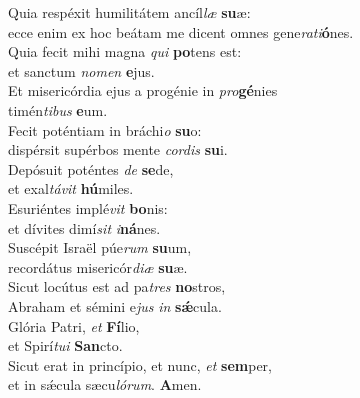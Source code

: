 \oddverse Quia respéxit humilitátem ancíl\textit{læ} \textbf{su}æ:~\*\\
\oddverse ecce enim ex hoc beátam me dicent omnes gene\textit{ra}\textit{ti}\textbf{ó}nes.\\
\evenverse Quia fecit mihi magna \textit{qui} \textbf{po}tens est:~\*\\
\evenverse et sanctum \textit{no}\textit{men} \textbf{e}jus.\\
\oddverse Et misericórdia ejus a progénie in \textit{pro}\textbf{gé}nies~\*\\
\oddverse timén\textit{ti}\textit{bus} \textbf{e}um.\\
\evenverse Fecit poténtiam in bráchi\textit{o} \textbf{su}o:~\*\\
\evenverse dispérsit supérbos mente \textit{cor}\textit{dis} \textbf{su}i.\\
\oddverse Depósuit poténtes \textit{de} \textbf{se}de,~\*\\
\oddverse et exal\textit{tá}\textit{vit} \textbf{hú}miles.\\
\evenverse Esuriéntes implé\textit{vit} \textbf{bo}nis:~\*\\
\evenverse et dívites dimí\textit{sit} \textit{i}\textbf{ná}nes.\\
\oddverse Suscépit Israël púe\textit{rum} \textbf{su}um,~\*\\
\oddverse recordátus misericór\textit{di}\textit{æ} \textbf{su}æ.\\
\evenverse Sicut locútus est ad pa\textit{tres} \textbf{no}stros,~\*\\
\evenverse Abraham et sémini e\textit{jus} \textit{in} \textbf{sǽ}cula.\\
\oddverse Glória Patri, \textit{et} \textbf{Fí}lio,~\*\\
\oddverse et Spirí\textit{tu}\textit{i} \textbf{San}cto.\\
\evenverse Sicut erat in princípio, et nunc, \textit{et} \textbf{sem}per,~\*\\
\evenverse et in sǽcula sæcu\textit{ló}\textit{rum}. \textbf{A}men.\\

